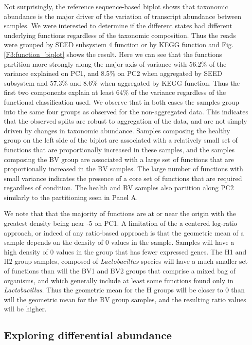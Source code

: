 \documentclass[10pt,letterpaper]{article}
\begin{document}
Not surprisingly, the reference sequence-based biplot shows that taxonomic abundance is the major driver of the variation of transcript abundance between samples. We were interested to determine if the different states had different underlying functions regardless of the taxonomic composition. Thus the reads were grouped by SEED subsystem 4 function or by KEGG function and Fig. \ref{F3:function_biplot} shows the result.  Here we can see that the functions partition more strongly along the major axis of variance with 56.2\% of the variance explained on PC1, and 8.5\% on PC2 when aggregated by SEED subsystem and 57.3\% and 8.6\% when aggregated by KEGG function. Thus the first two components explain at least 64\% of the variance regardless of the functional classification used. We observe that in both cases the  samples group into the same four groups as observed for the non-aggregated data. This indicates that the observed splits are robust to aggregation of the data, and are not simply driven by changes in taxonomic abundance. Samples composing the healthy group on the left side of the biplot are associated with a relatively small set of functions that are proportionally increased in these samples, and the samples composing the BV group are associated with a large set of functions that are proportionally increased in the BV samples.  The large number of functions with small variance indicates the presence of a core set of functions that are required regardless of condition. The health and BV samples also partition along PC2 similarly to the partitioning seen in Panel A. 

We note that that the majority of functions are at or near the origin with the greatest density being near -5 on PC1. A limitation of the a centered log-ratio approach, or indeed of any ratio-based approach is that the geometric mean of a sample depends on the density of 0 values in the sample.  Samples will have a high density of 0 values in the group that has fewer expressed genes. The H1 and H2 group samples, composed of \emph{Lactobacillus} species will have a much smaller set of functions than will the BV1 and BV2 groups that comprise a mixed bag of organisms, and which generally include at least some functions found only in \emph{Lactobacillus}. Thus the geometric mean for the H groups will be closer to 0 than will the geometric mean for the BV group samples, and the resulting ratio values will be higher. 

\subsection{Exploring differential abundance}
\end{document}
